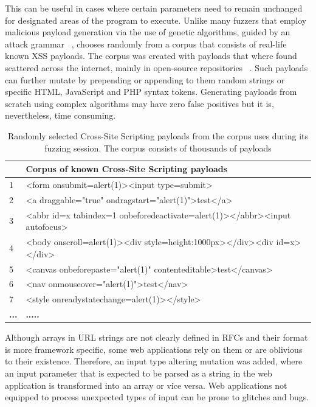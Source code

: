 This can be useful in cases where certain parameters need to remain unchanged for designated areas of the program to execute. Unlike many fuzzers that employ malicious payload generation via the use of genetic algorithms, guided by an attack grammar ~\cite{duchene2014kameleonfuzz}, \pname{} chooses randomly from a corpus that consists of real-life known XSS payloads. The corpus was created with payloads that where found scattered across the internet, mainly in open-source repositories ~\cite{seclist,xsspayloadfirst,xsspayloadsecond}. Such payloads can further mutate by prepending or appending to them random strings or specific HTML, JavaScript and PHP syntax tokens. Generating payloads from scratch using complex algorithms may have zero false positives but it is, nevertheless, time consuming.

\begin{table}[ht]
\centering
 \begin{tabular}{@{}|l|l|@{}}
 \hline
 \textbf{ } & \textbf{Corpus of known Cross-Site Scripting payloads} \\ 
 \hline\hline
 1 & <form onsubmit=alert(1)><input type=submit> \\ 
 \hline
 2 & <a draggable="true" ondragstart="alert(1)">test</a> \\ 
 \hline
 3 & <abbr id=x tabindex=1 onbeforedeactivate=alert(1)></abbr><input autofocus> \\ 
 \hline
 4 & <body onscroll=alert(1)><div style=height:1000px></div><div id=x></div> \\ 
 \hline
 5 & <canvas onbeforepaste="alert(1)" contenteditable>test</canvas> \\
 \hline
 6 & <nav onmouseover="alert(1)">test</nav> \\
 \hline
 7 & <style onreadystatechange=alert(1)></style> \\
 \hline
 \textbf{...} & \textbf{.....} \\
 \hline
 \end{tabular}
 \captionsetup{justification=centering}
 \caption{Randomly selected Cross-Site Scripting payloads from the corpus \pname{} uses during its fuzzing session. The corpus consists of thousands of payloads}
 \label{xss_payload_tables}
\end{table}

Although arrays in URL strings are not clearly defined in RFCs and their format is more framework specific, some web applications rely on them or are oblivious to their existence. Therefore, an input type altering mutation was added, where an input parameter that is
expected to be parsed as a string in the web application is transformed into an array or vice versa. Web applications not equipped to process unexpected types of input can be prone to glitches and bugs.

